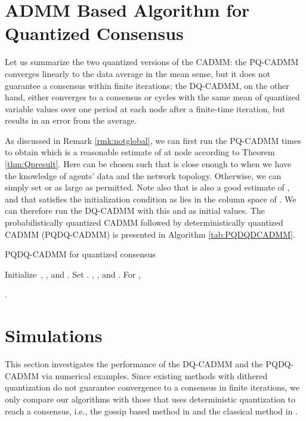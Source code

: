 \documentclass[journal]{IEEEtran}
\begin{document}
\section{ADMM Based Algorithm for Quantized Consensus}
\label{sec:algorithm}
Let us summarize the two quantized versions of the CADMM: the PQ-CADMM converges linearly to the data average in the mean sense, but it does not guarantee a consensus within finite iterations; the DQ-CADMM, on the other hand, either converges to a consensus or cycles with the same mean of quantized variable values over one period at each node after a finite-time iteration, but results in an error from the average. 

As discussed in Remark \ref{rmk:notglobal}, we can first run the PQ-CADMM  times to obtain  which is a reasonable estimate of  at node  according to Theorem \ref{thm:Qpresult}. Here  can be chosen such that  is close enough to  when we have the knowledge of agents' data and the network topology. Otherwise, we can simply set  or as large as permitted. Note also that  is also a good estimate of , and that  satisfies the initialization condition as  lies in the column space of . We can therefore run the DQ-CADMM with this  and  as initial values. The probabilistically quantized CADMM followed by deterministically quantized CADMM (PQDQ-CADMM) is presented in Algorithm \ref{tab:PQDQDCADMM}. 
\begin{algorithm}[htbp]
	\caption{PQDQ-CADMM for quantized consensus}
	\begin{algorithmic}[1]\label{tab:PQDQDCADMM}
	\REQUIRE Initialize~, , and . Set .
	\STATE 
	\ENDFOR
	 , , and .
	\REPEAT
			\STATE For , 
			
			 .	
\end{algorithmic}
\end{algorithm}
\section{Simulations}
\label{sec:simulation}
This section investigates the performance of the DQ-CADMM and the PQDQ-CADMM via numerical examples. Since existing methods with dithered quantization do not guarantee convergence to a consensus in finite iterations, we only compare our algorithms with those that uses deterministic quantization to reach a consensus, i.e., the gossip based method in \cite{Carli2010} and the classical method in \cite{Nedic2009}.
\end{document}
